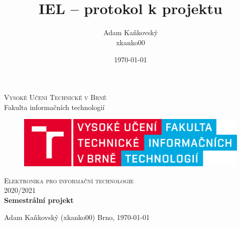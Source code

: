 \documentclass[]{fitiel} %
\title{\logo\\IEL -- protokol k projektu}
\author{Adam Kaňkovský \\ xkanko00}
\date{\today} %
\begin{document}
	\begin{titlepage}
		\begin{center}
			\textsc{\LARGE Vysoké Učení Technické v Brně} \\[0.5cm]
			{\LARGE Fakulta informačních technologií}

			\begin{figure}[H]
				\center\includegraphics[width=0.5\linewidth]{fig/logo_cz.png}
			\end{figure}

			\vspace{3cm}

			\textsc{\LARGE Elektronika pro informační technologie} \\[0.5cm]
			\textsc{\LARGE 2020/2021} \\[3.5cm]

			\textbf{{\LARGE Semestrální projekt}}
		\end{center}
		\vfill
		\begin{flushleft} 
			\large
			Adam Kaňkovský (xkanko00)
			\hfill
			Brno, \today
		\end{flushleft}
	\end{titlepage}

	\newpage

	\tableofcontents
	
	\newpage

	 \newpage
	 \newpage
	 \newpage
	 \newpage
	
	
	
\end{document}
